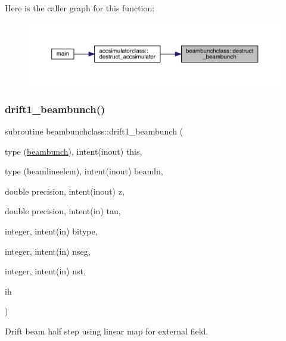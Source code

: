 Here is the caller graph for this function\+:\nopagebreak
\begin{figure}[H]
\begin{center}
\leavevmode
\includegraphics[width=350pt]{namespacebeambunchclass_a0fe1e4d236f209b18f75b272bf07782d_icgraph}
\end{center}
\end{figure}
\mbox{\label{namespacebeambunchclass_a212c0d38a812d95f238d7da7f29ac17c}} 
\subsubsection{\texorpdfstring{drift1\_beambunch()}{drift1\_beambunch()}}
{\footnotesize\ttfamily subroutine beambunchclass\+::drift1\+\_\+beambunch (\begin{DoxyParamCaption}\item[{type (\mbox{\hyperlink{namespacebeambunchclass_structbeambunchclass_1_1beambunch}{beambunch}}), intent(inout)}]{this,  }\item[{type (beamlineelem), intent(inout)}]{beamln,  }\item[{double precision, intent(inout)}]{z,  }\item[{double precision, intent(in)}]{tau,  }\item[{integer, intent(in)}]{bitype,  }\item[{integer, intent(in)}]{nseg,  }\item[{integer, intent(in)}]{nst,  }\item[{}]{ih }\end{DoxyParamCaption})}



Drift beam half step using linear map for external field. 

